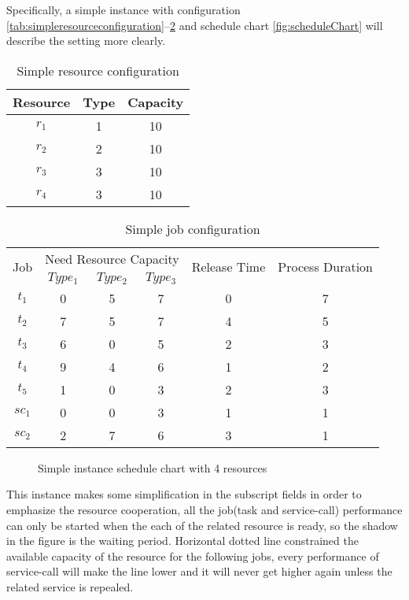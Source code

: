 Specifically, a simple instance with configuration \autoref{tab:simpleresourceconfiguration}--\ref{tab:simplejobconfiguration} and schedule chart \autoref{fig:scheduleChart} will describe the setting more clearly.
\begin{table}[htbp]
  \centering
  \scriptsize
  \caption{Simple resource configuration}
    \begin{tabular}{ccc}
    \toprule
    Resource & Type  & Capacity \\
    \midrule
    $r_1$ & 1     & 10 \\
    $r_2$ & 2     & 10 \\
    $r_3$ & 3     & 10 \\
    $r_4$ & 3     & 10 \\
    \bottomrule
    \end{tabular}%
  \label{tab:simpleresourceconfiguration}%
\end{table}%
\begin{table}[htbp]
  \centering
  \scriptsize
  \caption{Simple job configuration}
    \begin{tabular}{cccccc}
    \toprule
    \multicolumn{1}{c}{\multirow{2}[0]{*}{ Job}} & \multicolumn{3}{c}{Need Resource Capacity} & \multicolumn{1}{c}{\multirow{2}[0]{*}{Release Time}} & \multicolumn{1}{c}{\multirow{2}[0]{*}{Process Duration}} \\
    \multicolumn{1}{c}{} & $Type_1$ & $Type_2$ & $Type_3$ & \multicolumn{1}{c}{} & \multicolumn{1}{c}{} \\
    \midrule
    $t_1$ & 0     & 5     & 7     & 0     & 7 \\
    $t_2$ & 7     & 5     & 7     & 4     & 5 \\
    $t_3$ & 6     & 0     & 5     & 2     & 3 \\
    $t_4$ & 9	 & 4  & 6 & 1 &2 \\
    $t_5$ & 1 & 0 & 3 & 2 & 3\\
    $sc_1$ & 0     & 0     & 3    & 1     & 1 \\
    $sc_2$ & 2     & 7     & 6     & 3     & 1 \\
    \bottomrule
    \end{tabular}%
  \label{tab:simplejobconfiguration}%
\end{table}%
\begin{figure}[htbp]
	\centering
	\resizebox{.8\textwidth}{!}{}
	\caption{Simple instance schedule chart with 4 resources}
	\label{fig:scheduleChart}
\end{figure}
This instance makes some simplification in the subscript fields in order to emphasize the resource cooperation, all the job(task and service-call) performance can only be started when the each of the related resource is ready, so the shadow in the figure is the waiting period. Horizontal dotted line constrained the available capacity of the resource for the following jobs, every performance of service-call will make the line lower and it will never get higher again unless the related service is repealed.

